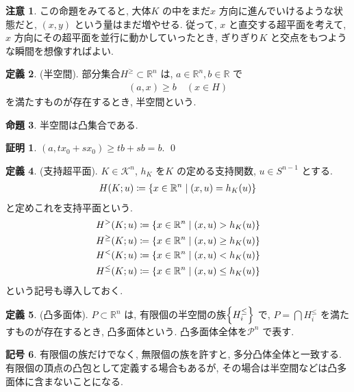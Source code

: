 \documentclass[10pt, fleqn, label-section=none]{bxjsarticle}
\theoremstyle{definition}
\newtheorem{dfn}{定義}[section]
\newtheorem{prop}[dfn]{命題}
\newtheorem{notation}[dfn]{記号}
\newtheorem*{pf*}{証明}
\newtheorem{remark}[dfn]{注意}
\newcommand{\cbra}[1]{\mleft\{#1\mright\}}
\renewcommand{\;}{\, ; \,}
\begin{document}
\begin{remark}この命題をみてると, 大体$K$ の中をまだ$x$ 方向に進んでいけるような状態だと, $(x, y)$ という量はまだ増やせる. 従って, $x$ と直交する超平面を考えて, $x$ 方向にその超平面を並行に動かしていったとき, ぎりぎり$K$ と交点をもつような瞬間を想像すればよい. 

\end{remark}




\begin{dfn}(半空間). 部分集合$H^{\geq} \subset \mathbb R^n$ は, $a \in \mathbb R^n, b \in \mathbb R$ で
\begin{align*} (a, x) \geq b \quad (x \in H)\end{align*} 
を満たすものが存在するとき, 半空間という. 
\end{dfn}

\begin{prop}半空間は凸集合である.

\end{prop}
\begin{pf*}
$(a, tx_0 + s x_0) \geq tb + sb = b.$
\qed
\end{pf*}

\begin{dfn}(支持超平面). $K \in \mathcal K^n$, $h_K$ を$K$ の定める支持関数, $u \in S^{n-1}$ とする. 
\begin{align*} H(K; u) \coloneqq \cbra{x \in \mathbb R^n \mid (x, u) = h_K (u) } \end{align*}
と定めこれを支持平面という. 
\begin{align*}  &H^{>} (K; u) \coloneqq \cbra{x \in \mathbb R^n \mid (x, u) > h_K (u) }  \\
&H^{\geq} (K; u) \coloneqq \cbra{x \in \mathbb R^n \mid (x, u) \geq h_K (u) } \\
&H^{<} (K; u) \coloneqq \cbra{x \in \mathbb R^n \mid (x, u) < h_K (u) } \\
&H^{\leq} (K; u) \coloneqq \cbra{x \in \mathbb R^n \mid (x, u) \leq h_K (u) } 
  \end{align*}
という記号も導入しておく. 
\end{dfn}

\begin{dfn}(凸多面体). $P \subset \mathbb R^n$ は, 有限個の半空間の族$\cbra{H^{\leq}_i}$ で, $P = \bigcap H^{\leq}_i$ を満たすものが存在するとき, 凸多面体という. 凸多面体全体を$\mathcal P ^n$ で表す. 
\end{dfn}


\begin{notation}有限個の族だけでなく, 無限個の族を許すと, 多分凸体全体と一致する. 有限個の頂点の凸包として定義する場合もあるが, その場合は半空間などは凸多面体に含まないことになる. 

\end{notation}
\end{document}
